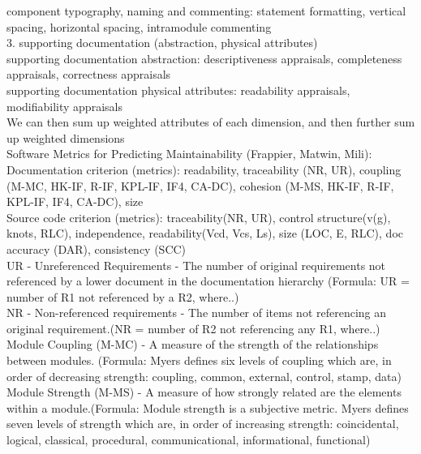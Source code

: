 \documentclass{article}
\begin{document}
component typography, naming and commenting: statement formatting, vertical spacing, horizontal spacing, intramodule commenting\\

3. supporting documentation (abstraction, physical attributes)\\
 
supporting documentation abstraction: descriptiveness appraisals, completeness appraisals, correctness appraisals\\

supporting documentation physical attributes: readability appraisals, modifiability appraisals\\

We can then sum up weighted attributes of each dimension, and then further sum up weighted dimensions\\

\noindent Software Metrics for Predicting Maintainability (Frappier, Matwin, Mili): \\

Documentation criterion (metrics): readability, traceability (NR, UR), coupling (M-MC, HK-IF, R-IF, KPL-IF, IF4, CA-DC), cohesion (M-MS, HK-IF, R-IF, KPL-IF, IF4, CA-DC), size\\

Source code criterion (metrics): traceability(NR, UR), control structure(v(g), knots, RLC), independence, readability(Vcd, Vcs, Ls), size (LOC, E, RLC), doc accuracy (DAR), consistency (SCC)\\

UR - Unreferenced Requirements - The  number  of  original  requirements  not  referenced  by  a  lower  document  in  the  documentation hierarchy (Formula: UR = number of R1 not referenced by a R2, where..)\\

NR - Non-referenced requirements - The number of items not referencing an original requirement.(NR = number of R2 not referencing any R1, where..)\\

Module Coupling (M-MC) - A measure of the strength of the relationships between modules. (Formula: Myers defines six levels of coupling which are, in order of decreasing strength: coupling, common, external, control, stamp, data)\\

Module Strength (M-MS) - A measure of how strongly related are the elements within a module.(Formula: Module  strength  is  a  subjective  metric.    Myers  defines  seven  levels  of  strength  which are, in order of increasing strength: coincidental, logical, classical, procedural, communicational, informational, functional)\\
\end{document}
